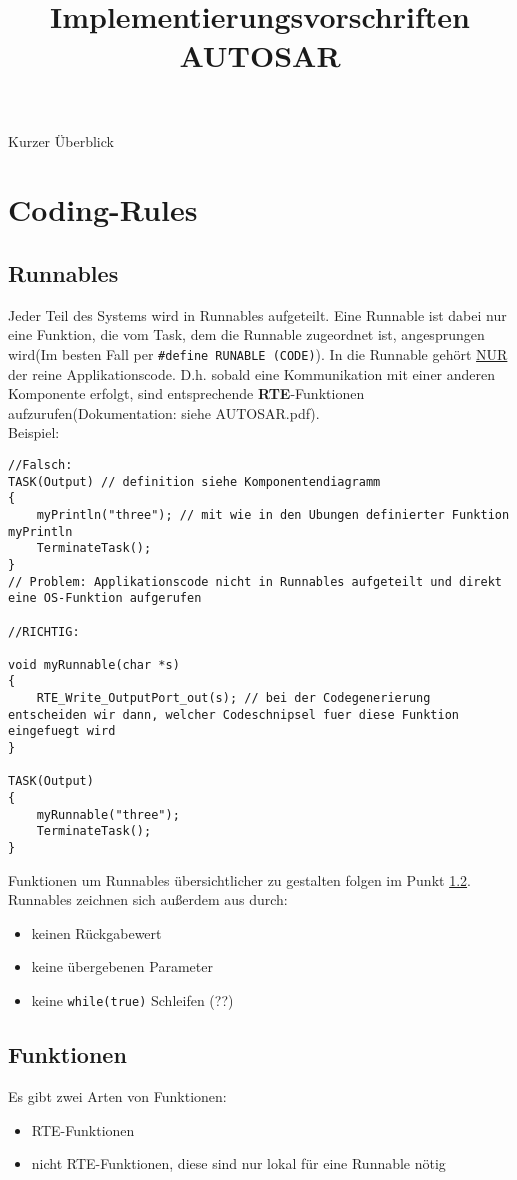 \documentclass[]{scrartcl}
\title{Implementierungsvorschriften AUTOSAR}
\author{}
\newcommand{\DokAutosar}{AUTOSAR.pdf}
\begin{document}
\maketitle

Kurzer Überblick

\section{Coding-Rules}
\label{sec:Coding-Rules}
\subsection{Runnables}
\label{sbsec:Runnables}
Jeder Teil des Systems wird in Runnables aufgeteilt. Eine Runnable ist dabei nur eine Funktion, die vom Task, dem die Runnable zugeordnet ist, angesprungen wird(Im besten Fall per \lstinline{#define RUNABLE (CODE)}). In die Runnable gehört \underline{NUR} der reine Applikationscode. D.h. sobald eine Kommunikation mit einer anderen Komponente erfolgt, sind entsprechende \textbf{RTE}-Funktionen aufzurufen(Dokumentation: siehe \DokAutosar).\\
Beispiel:
\begin{lstlisting}
//Falsch:
TASK(Output) // definition siehe Komponentendiagramm
{
	myPrintln("three"); // mit wie in den Ubungen definierter Funktion myPrintln
	TerminateTask();
}
// Problem: Applikationscode nicht in Runnables aufgeteilt und direkt eine OS-Funktion aufgerufen

//RICHTIG:

void myRunnable(char *s)
{
	RTE_Write_OutputPort_out(s); // bei der Codegenerierung entscheiden wir dann, welcher Codeschnipsel fuer diese Funktion eingefuegt wird
}

TASK(Output)
{
	myRunnable("three");
	TerminateTask();
}
\end{lstlisting}
Funktionen um Runnables übersichtlicher zu gestalten folgen im Punkt \ref{sbsec:Funktionen}. Runnables zeichnen sich außerdem aus durch:
\begin{itemize}
\item keinen Rückgabewert
\item keine übergebenen Parameter
\item keine \lstinline|while(true)| Schleifen (??)
\end{itemize}

\subsection{Funktionen}
\label{sbsec:Funktionen}
Es gibt zwei Arten von Funktionen:
\begin{itemize}
\item RTE-Funktionen
\item nicht RTE-Funktionen, diese sind nur lokal für eine Runnable nötig
\end{itemize}
\end{document}
